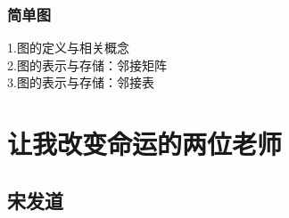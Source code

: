\documentclass[12pt,twiside,a4paper]{ctexbook}
\numberwithin{chapter}{part}
\begin{document}
\subsection{简单图}
1.图的定义与相关概念\\
2.图的表示与存储：邻接矩阵\\
3.图的表示与存储：邻接表


\subsection{}
\subsection{}
\subsection{}
\subsection{}


\chapter{让我改变命运的两位老师}
\section{宋发道}
\end{document}
